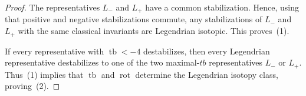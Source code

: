 \documentclass[10pt,a4paper]{amsart}
\DeclareMathOperator{\rot}{rot}
\DeclareMathOperator{\tb}{tb}
\begin{document}
\begin{proof}
The representatives \(L_-\) and \(L_+\) have a common stabilization. Hence,
using that positive and negative stabilizations commute, any stabilizations of
\(L_-\) and \(L_+\) with the same classical invariants are Legendrian isotopic.
This proves~(1).

If every representative with \(\tb<-4\) destabilizes, then every Legendrian
representative destabilizes to one of the two maximal-\(tb\) representatives
\(L_-\) or \(L_+\). Thus~(1) implies that \(\tb\) and \(\rot\) determine the
Legendrian isotopy class, proving~(2).
\end{proof}
\end{document}
